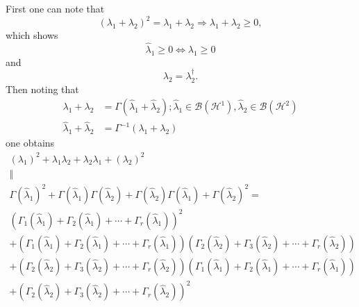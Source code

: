 \documentclass[aps,preprint]{revtex4}%
\begin{document}
First one can note that
\begin{equation}
\left(  \lambda_{1}+\lambda_{2}\right)  ^{2}=\lambda_{1}+\lambda
_{2}\Rightarrow\lambda_{1}+\lambda_{2}\geq0,
\end{equation}
which shows
\begin{equation}
\hat{\lambda}_{1}\geq0\Leftrightarrow\lambda_{1}\geq0
\end{equation}
and
\begin{equation}
\lambda_{2}=\lambda_{2}^{\dagger}.
\end{equation}
Then noting that
\begin{align}
\lambda_{1}+\lambda_{2}  &  =\Gamma\left(  \hat{\lambda}_{1}+\hat{\lambda}%
_{2}\right)  ;\hat{\lambda}_{1}\in\mathcal{B}\left(  \mathcal{H}^{1}\right)
,\hat{\lambda}_{2}\in\mathcal{B}\left(  \mathcal{H}^{2}\right) \nonumber\\
\hat{\lambda}_{1}+\hat{\lambda}_{2}  &  =\Gamma^{-1}\left(  \lambda
_{1}+\lambda_{2}\right)
\end{align}
one obtains%
\begin{gather}
\left(  \lambda_{1}\right)  ^{2}+\lambda_{1}\lambda_{2}+\lambda_{2}\lambda
_{1}+\left(  \lambda_{2}\right)  ^{2}\nonumber\\
\Vert\nonumber\\
\Gamma\left(  \hat{\lambda}_{1}\right)  ^{2}+\Gamma\left(  \hat{\lambda}%
_{1}\right)  \Gamma\left(  \hat{\lambda}_{2}\right)  +\Gamma\left(
\hat{\lambda}_{2}\right)  \Gamma\left(  \hat{\lambda}_{1}\right)
+\Gamma\left(  \hat{\lambda}_{2}\right)  ^{2}=\nonumber\\
\left(  \Gamma_{1}\left(  \hat{\lambda}_{1}\right)  +\Gamma_{2}\left(
\hat{\lambda}_{1}\right)  +\cdots+\Gamma_{r}\left(  \hat{\lambda}_{1}\right)
\right)  ^{2}\nonumber\\
+\left(  \Gamma_{1}\left(  \hat{\lambda}_{1}\right)  +\Gamma_{2}\left(
\hat{\lambda}_{1}\right)  +\cdots+\Gamma_{r}\left(  \hat{\lambda}_{1}\right)
\right)  \left(  \Gamma_{2}\left(  \hat{\lambda}_{2}\right)  +\Gamma
_{3}\left(  \hat{\lambda}_{2}\right)  +\cdots+\Gamma_{r}\left(  \hat{\lambda
}_{2}\right)  \right) \nonumber\\
+\left(  \Gamma_{2}\left(  \hat{\lambda}_{2}\right)  +\Gamma_{3}\left(
\hat{\lambda}_{2}\right)  +\cdots+\Gamma_{r}\left(  \hat{\lambda}_{2}\right)
\right)  \left(  \Gamma_{1}\left(  \hat{\lambda}_{1}\right)  +\Gamma
_{2}\left(  \hat{\lambda}_{1}\right)  +\cdots+\Gamma_{r}\left(  \hat{\lambda
}_{1}\right)  \right) \nonumber\\
+\left(  \Gamma_{2}\left(  \hat{\lambda}_{2}\right)  +\Gamma_{3}\left(
\hat{\lambda}_{2}\right)  +\cdots+\Gamma_{r}\left(  \hat{\lambda}_{2}\right)
\right)  ^{2}%
\end{gather}
\end{document}
